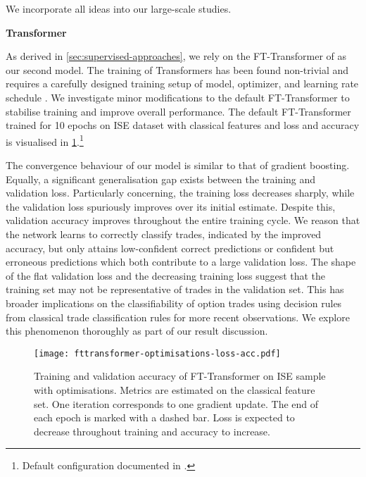 We incorporate all ideas into our large-scale studies.

\textbf{Transformer}

As derived in \cref{sec:supervised-approaches}, we rely on the FT-Transformer of \textcite[][4--5]{gorishniyRevisitingDeepLearning2021} as our second model. The training of Transformers has been found non-trivial and requires a carefully designed training setup of model, optimizer, and learning rate schedule \autocite[][1]{liuUnderstandingDifficultyTraining2020}. We investigate minor modifications to the default FT-Transformer to stabilise training and improve overall performance. The default FT-Transformer trained for 10 epochs on \gls{ISE} dataset with classical features and loss and accuracy is visualised in \cref{fig:fttransformer-optimisations-loss-acc}.\footnote{Default configuration documented in \textcite[][18]{gorishniyRevisitingDeepLearning2021}.}

The convergence behaviour of our model is similar to that of gradient boosting. Equally, a significant generalisation gap exists between the training and validation loss. Particularly concerning, the training loss decreases sharply, while the validation loss spuriously improves over its initial estimate. Despite this, validation accuracy improves throughout the entire training cycle. We reason that the network learns to correctly classify trades, indicated by the improved accuracy, but only attains low-confident correct predictions or confident but erroneous predictions which both contribute to a large validation loss. The shape of the flat validation loss and the decreasing training loss suggest that the training set may not be representative of trades in the validation set. This has broader implications on the classifiability of option trades using decision rules from classical trade classification rules for more recent observations. We explore this phenomenon thoroughly as part of our result discussion.

\begin{figure}[!ht]
    \centering
    \texttt{[image: fttransformer-optimisations-loss-acc.pdf]}
    \caption[Training and Validation Accuracy of FT-Transformer with Optimisations]{Training and validation accuracy of FT-Transformer on \gls{ISE} sample with optimisations. Metrics are estimated on the classical feature set. One iteration corresponds to one gradient update. The end of each epoch is marked with a dashed bar. Loss is expected to decrease throughout training and accuracy to increase.}
    \label{fig:fttransformer-optimisations-loss-acc}
\end{figure}

